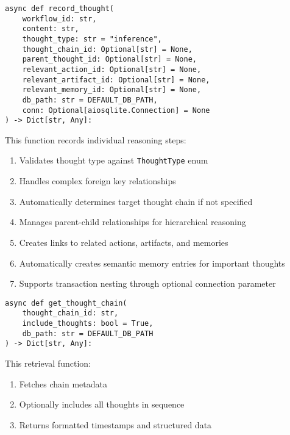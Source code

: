 \documentclass[12pt,a4paper]{article}
\newcommand{\code}[1]{\texttt{#1}}
\begin{document}
\begin{pageablecode}
\begin{verbatim}
async def record_thought(
    workflow_id: str,
    content: str,
    thought_type: str = "inference",
    thought_chain_id: Optional[str] = None,
    parent_thought_id: Optional[str] = None,
    relevant_action_id: Optional[str] = None,
    relevant_artifact_id: Optional[str] = None,
    relevant_memory_id: Optional[str] = None,
    db_path: str = DEFAULT_DB_PATH,
    conn: Optional[aiosqlite.Connection] = None
) -> Dict[str, Any]:
\end{verbatim}
\end{pageablecode}
This function records individual reasoning steps:
\begin{enumerate}[label=\arabic*.]
    \item Validates thought type against \code{ThoughtType} enum
    \item Handles complex foreign key relationships
    \item Automatically determines target thought chain if not specified
    \item Manages parent-child relationships for hierarchical reasoning
    \item Creates links to related actions, artifacts, and memories
    \item Automatically creates semantic memory entries for important thoughts
    \item Supports transaction nesting through optional connection parameter
\end{enumerate}

\begin{pageablecode}
\begin{verbatim}
async def get_thought_chain(
    thought_chain_id: str,
    include_thoughts: bool = True,
    db_path: str = DEFAULT_DB_PATH
) -> Dict[str, Any]:
\end{verbatim}
\end{pageablecode}
This retrieval function:
\begin{enumerate}[label=\arabic*.]
    \item Fetches chain metadata
    \item Optionally includes all thoughts in sequence
    \item Returns formatted timestamps and structured data
\end{enumerate}
\end{document}
